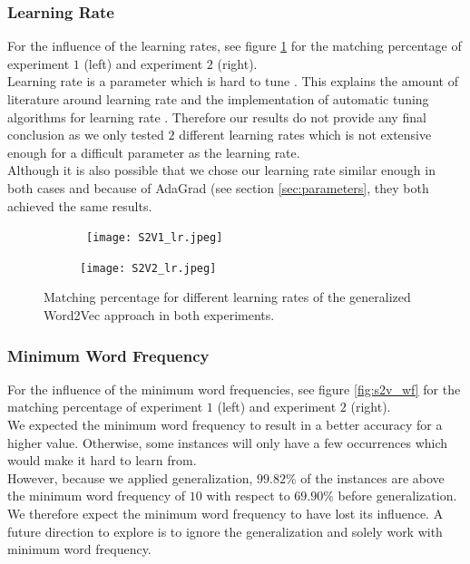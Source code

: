 \subsubsection{Learning Rate}

For the influence of the learning rates, see figure \ref{fig:s2v_lr} for the matching percentage of experiment $1$ (left) and experiment $2$ (right). \\
Learning rate is a parameter which is hard to tune \cite{peskyLr:article}. This explains the amount of literature around learning rate and the implementation of automatic tuning algorithms for learning rate \cite{peskyLr:article} \cite{adagrad:article} \cite{lrHard:article}. Therefore our results do not provide any final conclusion as we only tested $2$ different learning rates which is not extensive enough for a difficult parameter as the learning rate. \\
Although it is also possible that we chose our learning rate similar enough in both cases and because of AdaGrad (see section \ref{sec:parameters}, they both achieved the same results.

\begin{figure}[!htb]
	\centering
	\begin{subfigure}[b]{.49\textwidth}\
		\texttt{[image: S2V1\_lr.jpeg]}
	\end{subfigure}
	\begin{subfigure}[b]{.49\textwidth}
		\texttt{[image: S2V2\_lr.jpeg]}
	\end{subfigure}
	\caption{Matching percentage for different learning rates of the generalized Word2Vec 		approach in both experiments.}
	\label{fig:s2v_lr}
\end{figure}



\subsubsection{Minimum Word Frequency}

For the influence of the minimum word frequencies, see figure \ref{fig:s2v_wf} for the matching percentage of experiment $1$ (left) and experiment $2$ (right). \\
We expected the minimum word frequency to result in a better accuracy for a higher value. Otherwise, some instances will only have a few occurrences which would make it hard to learn from. \\
However, because we applied generalization, $99.82$\% of the instances are above the minimum word frequency of $10$ with respect to $69.90$\% before generalization. We therefore expect the minimum word frequency to have lost its influence. A future direction to explore is to ignore the generalization and solely work with minimum word frequency.


